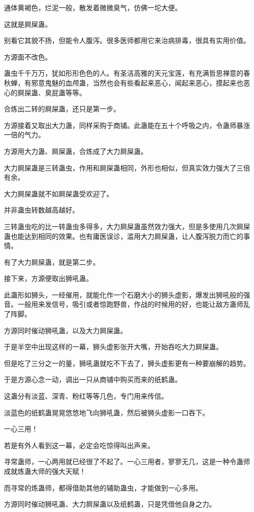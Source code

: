 \begin{this_body}
通体黄褐色，烂泥一般，散发着微微臭气，仿佛一坨大便。

这就是屙屎蛊。

别看它其貌不扬，但能令人腹泻。很多医师都用它来治病排毒，很具有实用价值。

方源面不改色。

蛊虫千千万万，犹如形形色色的人。有圣洁高雅的天元宝莲，有充满哲思禅意的春秋蝉，有邪意鬼魅的血颅蛊，当然也会有些看起来恶心，闻起来恶心，摸起来也恶心的屙屎蛊、臭屁蛊等等。

合炼出二转的屙屎蛊，还只是第一步。

方源接着又取出大力蛊，同样采购于商铺。此蛊能在五十个呼吸之内，令蛊师暴涨一倍的气力。

方源用大力蛊、屙屎蛊，合炼成了大力屙屎蛊。

大力屙屎蛊是三转蛊虫，作用和屙屎蛊相同，外形也相似，但真实效力强大了三倍有余。

大力屙屎蛊就不如屙屎蛊受欢迎了。

并非蛊虫转数越高越好。

三转蛊虫吃的比一转蛊虫多得多，大力屙屎蛊虽然效力强大，但是多使用几次屙屎蛊也能达到相同的效果。也有庸医误诊，滥用大力屙屎蛊，让人腹泻脱力而亡的事情。

有了大力屙屎蛊，就是第二步。

接下来，方源便取出狮吼蛊。

此蛊形如狮头，一经催用，就能化作一个石磨大小的狮头虚影，爆发出狮吼般的强音。一般用来发信号，吸引或者惊跑野兽，作战的时候用的好，也能让敌方蛊师乱了阵脚。

方源同时催动狮吼蛊，以及大力屙屎蛊。

于是半空中出现这样的一幕，狮头虚影张开大嘴，开始吞吃大力屙屎蛊。

但是吃了三分之一的量，狮吼蛊就吃不下去了，狮头虚影更有一种要崩解的趋势。

于是方源心念一动，调出一只从商铺中购买而来的纸鹤蛊。

这蛊分有淡蓝、深青、粉红等等几色，专门用来传信。

淡蓝色的纸鹤蛊晃晃悠悠地飞向狮吼蛊，然后被狮头虚影一口吞下。

一心三用！

若是有外人看到这一幕，必定会吃惊得叫出声来。

寻常蛊师，一心两用就已经很了不起了。一心三用者，寥寥无几，这是一种令蛊师成就炼蛊大师的强大天赋！

而寻常的炼蛊师，都得借助其他的辅助蛊虫，才能做到一心多用。

方源同时催动狮吼蛊、大力屙屎蛊以及纸鹤蛊，只是凭借他自身之力。


\end{this_body}
